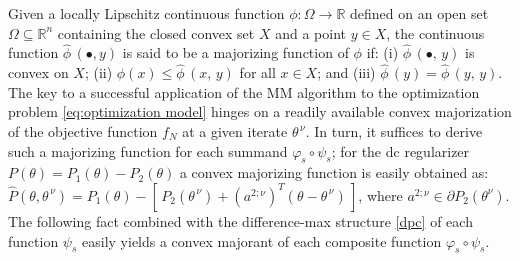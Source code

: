 \documentclass{siamart}
\newcommand{\epc}{\hspace{1pc}}
\newcommand{\wh}{\widehat}
\begin{document}
Given a locally Lipschitz continuous function $\phi : \Omega \to \mathbb{R}$ defined on an open set $\Omega \subseteq \mathbb{R}^n$
containing the closed convex set $X$ and a point $y \in X$,
the continuous function $\wh{\phi}\,(\bullet,y)$ is said to be a majorizing function of $\phi$  if: (i) $\wh{\phi}\,(\bullet,\,y)$ is
convex on $X$; (ii) $\phi(x) \leq \wh{\phi}\,(x,\,y)$ for all $x\in X$; and (iii) $\wh{\phi}\,(y) = \wh{\phi}\,(y,\,y)$.
The key to a successful application of the MM algorithm to the optimization problem \eqref{eq:optimization model}
hinges on a readily available convex majorization of the objective function $f_N$ at a given iterate $\theta^{\, \nu}$.
In turn, it suffices to derive such a majorizing function for each summand $\varphi_s \circ \psi_s$;
for the dc regularizer $P(\theta) = P_1(\theta)- P_2(\theta)$ a convex majorizing function is easily obtained as:
$\wh{P} (\theta,\theta^{\, \nu}) = P_1(\theta)-  [ \, P_2(\theta^{\, \nu})+(a^{2; \nu})^T( \theta - \theta^{\, \nu}) \, ]$,
where $a^{2; \nu} \in \partial P_2(\theta^\nu)$.  The following fact combined with the difference-max structure \eqref{dpc}
of each function $\psi_s$ easily yields a convex majorant of each composite function $\varphi_s \circ \psi_s$.


\end{document}
